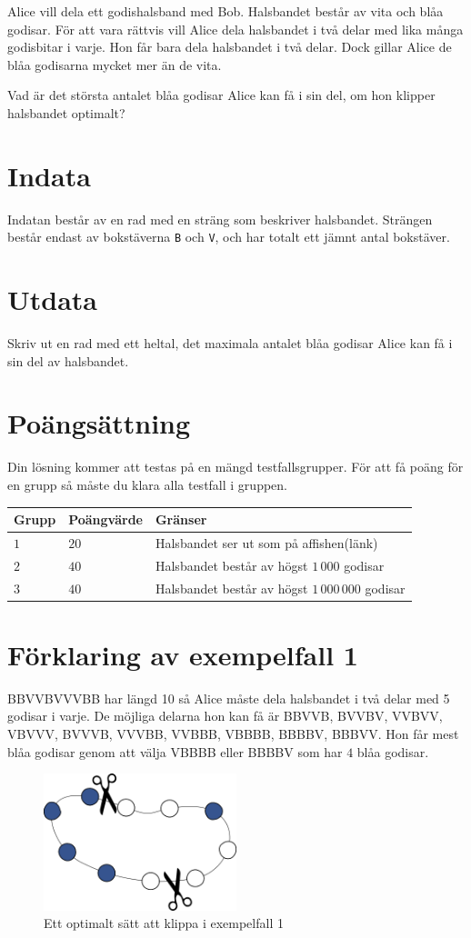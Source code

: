 Alice vill dela ett godishalsband med Bob.
Halsbandet består av vita och blåa godisar.
För att vara rättvis vill Alice dela halsbandet i två
delar med lika många godisbitar i varje.
Hon får bara dela halsbandet i två delar.
Dock gillar Alice de blåa godisarna mycket mer än de vita.

Vad är det största antalet blåa godisar Alice kan få i sin del,
om hon klipper halsbandet optimalt?

\section*{Indata}
Indatan består av en rad med en sträng som beskriver halsbandet.
Strängen består endast av bokstäverna \texttt{B} och \texttt{V},
och har totalt ett jämnt antal bokstäver.

\section*{Utdata}
Skriv ut en rad med ett heltal, det maximala antalet blåa godisar Alice
kan få i sin del av halsbandet.

\section*{Poängsättning}
Din lösning kommer att testas på en mängd testfallsgrupper.
För att få poäng för en grupp så måste du klara alla testfall i gruppen.

\noindent
\begin{tabular}{| l | l | l |}
\hline
Grupp & Poängvärde & Gränser \\ \hline
$1$   & $20$       & Halsbandet ser ut som på affishen(länk) \\ \hline
$2$   & $40$       & Halsbandet består av högst $1\,000$ godisar\\ \hline
$3$   & $40$       & Halsbandet består av högst $1\,000\,000$ godisar \\ \hline
\end{tabular}

\section*{Förklaring av exempelfall 1}
BBVVBVVVBB har längd 10 så Alice måste dela halsbandet i två delar med 5 godisar i varje.
De möjliga delarna hon kan få är BBVVB, BVVBV, VVBVV, VBVVV, BVVVB, VVVBB, VVBBB, VBBBB, BBBBV, BBBVV.
Hon får mest blåa godisar genom att välja VBBBB eller BBBBV som har $4$ blåa godisar.

\begin{figure}[h]
	\centering
\includegraphics[width=0.5\textwidth]{sample1}
\caption{Ett optimalt sätt att klippa i exempelfall 1}
\end{figure}
